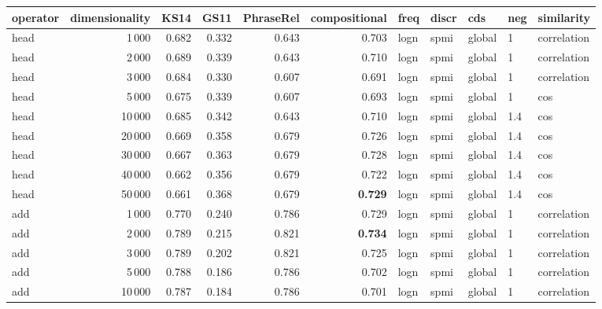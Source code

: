 \begin{tabular}{lrrrrrlllll}
\toprule
operator &  dimensionality &   KS14 &   GS11 &  PhraseRel &  compositional &  freq &  discr &     cds &  neg &     similarity \\
\midrule
    head &            1\,000 &  0.682 &  0.332 &      0.643 &          0.703 &  logn &   spmi &  global &    1 &    correlation \\
    head &            2\,000 &  0.689 &  0.339 &      0.643 &          0.710 &  logn &   spmi &  global &    1 &    correlation \\
    head &            3\,000 &  0.684 &  0.330 &      0.607 &          0.691 &  logn &   spmi &  global &    1 &    correlation \\
    head &            5\,000 &  0.675 &  0.339 &      0.607 &          0.693 &  logn &   spmi &  global &    1 &            cos \\
    head &           10\,000 &  0.685 &  0.342 &      0.643 &          0.710 &  logn &   spmi &  global &  1.4 &            cos \\
    head &           20\,000 &  0.669 &  0.358 &      0.679 &          0.726 &  logn &   spmi &  global &  1.4 &            cos \\
    head &           30\,000 &  0.667 &  0.363 &      0.679 &          0.728 &  logn &   spmi &  global &  1.4 &            cos \\
    head &           40\,000 &  0.662 &  0.356 &      0.679 &          0.722 &  logn &   spmi &  global &  1.4 &            cos \\
    head &           50\,000 &  0.661 &  0.368 &      0.679 &          \textbf{0.729} &  logn &   spmi &  global &  1.4 &            cos \\ \addlinespace
     add &            1\,000 &  0.770 &  0.240 &      0.786 &          0.729 &  logn &   spmi &  global &    1 &    correlation \\
     add &            2\,000 &  0.789 &  0.215 &      0.821 &          \textbf{0.734} &  logn &   spmi &  global &    1 &    correlation \\
     add &            3\,000 &  0.789 &  0.202 &      0.821 &          0.725 &  logn &   spmi &  global &    1 &    correlation \\
     add &            5\,000 &  0.788 &  0.186 &      0.786 &          0.702 &  logn &   spmi &  global &    1 &    correlation \\
     add &           10\,000 &  0.787 &  0.184 &      0.786 &          0.701 &  logn &   spmi &  global &    1 &    correlation \\

\end{tabular}
